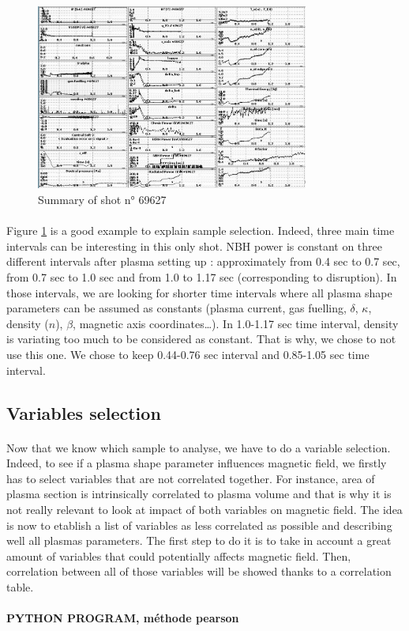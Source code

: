 \documentclass[12pt]{article}
\begin{document}
\begin{figure}[h]
    \centering
    \includegraphics[width=0.8\textwidth]{Figures/shot_summary_69627.png}
    \caption{Summary of shot n° 69627}
    \label{fig:jScope shot summary}
\end{figure}

\paragraph{}
Figure \ref{fig:jScope shot summary} is a good example to explain sample selection. Indeed, three main time intervals can be interesting in this only shot. NBH power is constant on three different intervals after plasma setting up : approximately from 0.4 sec to 0.7 sec, from 0.7 sec to 1.0 sec and from 1.0 to 1.17 sec (corresponding to disruption). In those intervals, we are looking for shorter time intervals where all plasma shape parameters can be assumed as constants (plasma current, gas fuelling, \(\delta\), \(\kappa\), density (\(n\)), \(\beta\), magnetic axis coordinates\dots). In 1.0-1.17 sec time interval, density is variating too much to be considered as constant. That is why, we chose to not use this one. We chose to keep 0.44-0.76 sec interval and 0.85-1.05 sec time interval. 

\subsection{Variables selection}

\paragraph{}
Now that we know which sample to analyse, we have to do a variable selection. Indeed, to see if a plasma shape parameter influences magnetic field, we firstly has to select variables that are not correlated together. For instance, area of plasma section is intrinsically correlated to plasma volume and that is why it is not really relevant to look at impact of both variables on magnetic field. The idea is now to etablish a list of variables as less correlated as possible and describing well all plasmas parameters. The first step to do it is to take in account a great amount of variables that could potentially affects magnetic field. Then, correlation between all of those variables will be showed thanks to a correlation table. 



\paragraph{PYTHON PROGRAM, méthode pearson}
 
\appendix

%

\newpage
\printbibliography
\end{document}
